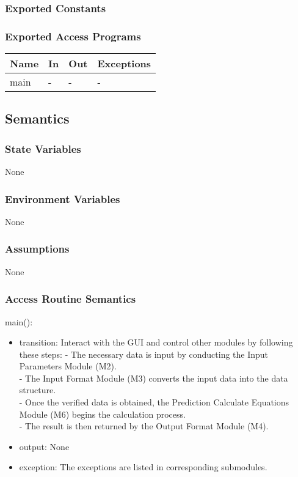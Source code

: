 \documentclass[12pt, titlepage]{article}
\begin{document}
\subsubsection{Exported Constants}

\subsubsection{Exported Access Programs}

\begin{center}
\begin{tabular}{p{2cm} p{4cm} p{4cm} p{2cm}}
\hline
\textbf{Name} & \textbf{In} & \textbf{Out} & \textbf{Exceptions} \\
\hline
main & - & - & - \\
\hline
\end{tabular}
\end{center}

\subsection{Semantics}

\subsubsection{State Variables}

None

\subsubsection{Environment Variables}

None

\subsubsection{Assumptions}

None

\subsubsection{Access Routine Semantics}

main():
\begin{itemize}
\item transition: Interact with the GUI and control other modules by following these steps:
    - The necessary data is input by conducting the Input Parameters Module (M2).\\
    - The Input Format Module (M3) converts the input data into the data structure.\\
    - Once the verified data is obtained, the Prediction Calculate Equations Module (M6) begins the calculation process.\\
    - The result is then returned by the Output Format Module (M4).\\

\item output: None
\item exception: The exceptions are listed in corresponding submodules.

\end{itemize}
\end{document}
